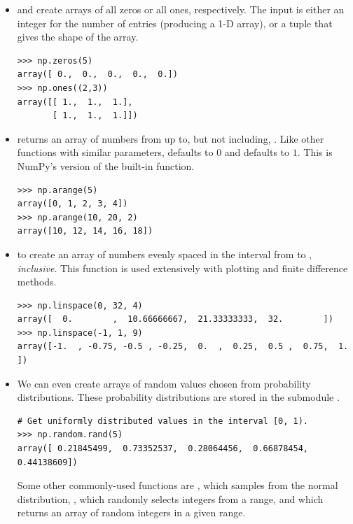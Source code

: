 \begin{itemize}

\item {} and  create arrays of all zeros or all ones, respectively.
The input is either an integer for the number of entries (producing a 1-D array), or a tuple that gives the shape of the array.
\begin{lstlisting}
>>> np.zeros(5)
array([ 0.,  0.,  0.,  0.,  0.])
>>> np.ones((2,3))
array([[ 1.,  1.,  1.],
       [ 1.,  1.,  1.]])
\end{lstlisting}

\item {} returns an array of numbers from  up to, but not including, .
Like other functions with similar parameters,  defaults to $0$ and  defaults to $1$.
This is NumPy's version of the built-in  function.

\begin{lstlisting}
>>> np.arange(5)
array([0, 1, 2, 3, 4])
>>> np.arange(10, 20, 2) 
array([10, 12, 14, 16, 18])
\end{lstlisting}

\item {} to create an array of  numbers evenly spaced in the interval from  to , \emph{inclusive}.
This function is used extensively with plotting and finite difference methods.
\begin{lstlisting}
>>> np.linspace(0, 32, 4) 
array([  0.        ,  10.66666667,  21.33333333,  32.        ])
>>> np.linspace(-1, 1, 9)
array([-1.  , -0.75, -0.5 , -0.25,  0.  ,  0.25,  0.5 ,  0.75,  1.  ])
\end{lstlisting} 

\item We can even create arrays of random values chosen from probability distributions.
These probability distributions are stored in the submodule .
\begin{lstlisting}
# Get uniformly distributed values in the interval [0, 1).
>>> np.random.rand(5)
array([ 0.21845499,  0.73352537,  0.28064456,  0.66878454,  0.44138609])
\end{lstlisting} 
Some other commonly-used functions are , which samples from the normal distribution, , which randomly selects integers from a range, and  which returns an array of random integers in a given range.
\end{itemize}

